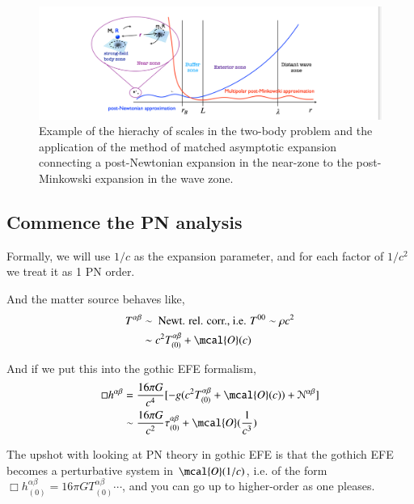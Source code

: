 \documentclass[a4paper, 12pt]{article}
\begin{document}
\begin{figure}[h!]
\begin{center}
  \includegraphics[scale=0.3]{Figures/PNcompare.jpeg}
\end{center}
\caption{Example of the hierachy of scales in the two-body problem and
  the application of the method of matched asymptotic expansion connecting
  a post-Newtonian expansion in the near-zone to the post-Minkowski
  expansion in the wave zone.}
\label{fig:PNcompare}
\end{figure}

\subsection{Commence the PN analysis}%
  \label{sub:Commence the PN analysis}
  Formally, we will use \( 1/c \) as the expansion parameter, and for each
  factor of \( 1/c^2 \) we treat it as 1 PN order. 

  And the matter source behaves like, 
  \begin{align}
    \label{PN EM tensor}
    T^{\alpha \beta} &\sim \textnormal{ Newt. rel. corr., i.e. } T^{00}
    \sim \rho c^2  \\ 
    &\sim c^2 T_{(0)}^{\alpha \beta} + \mcal{O}(c) 
  \end{align}

  And if we put this into the gothic EFE formalism, 
  \begin{align}
    \label{gothic PN}
    \Box h^{\alpha\beta} &=  \frac{16 \pi G}{c^4} [ -g ( c^2
    T_{(0)}^{\alpha \beta} + \mcal{O}(c) ) + \mathcal{N}^{\alpha \beta}  ]
    \\ 
    &\sim \frac{16 \pi G}{c^2} \tau_{(0)}^{\alpha \beta} +
    \mcal{O}(\frac{1}{c^3})
  \end{align}

  The upshot with looking at PN theory in gothic EFE is that the gothich
  EFE becomes a perturbative system in \(  \mcal{O}(1/c) \), i.e. of the
  form \(  \Box h_{(0)}^{\alpha \beta} = 16 \pi G T_{(0)}^{\alpha \beta}
  \cdots \), and you can go up to higher-order as one pleases.
  
\end{document}

